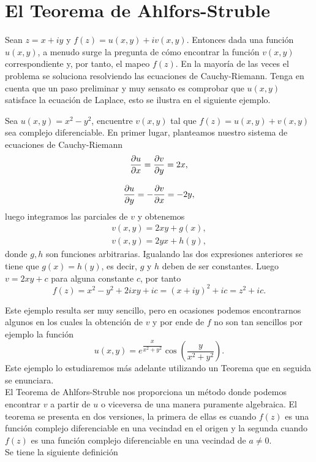 \section{El Teorema de Ahlfors-Struble}
 Sean $z = x + iy$ y $f(z) = u(x, y)+iv(x, y)$. Entonces dada una función $u(x, y)$, a menudo surge la pregunta de cómo encontrar la función $v(x,y)$ correspondiente y, por tanto, el mapeo  $f(z)$. En la mayoría de las veces el problema se soluciona resolviendo las ecuaciones de Cauchy-Riemann. Tenga en cuenta que un paso preliminar y muy sensato es comprobar que $u(x,y)$  satisface la ecuación de Laplace, esto se ilustra en el siguiente ejemplo.
 \begin{Ejem}\label{EjCR}
 	Sea $u(x,y)=x^2-y^2$, encuentre $v(x,y)$ tal que $f(z)=u(x,y)+v(x,y)$ sea complejo diferenciable.
 	\solu
 	En primer lugar, planteamos nuestro sistema de ecuaciones de Cauchy-Riemann
 	\[
 		\begin{array}{c}
 			\dfrac{\partial u}{\partial x}=\dfrac{\partial v}{\partial y}=2x,\\\\
 			\dfrac{\partial u}{\partial y}=-\dfrac{\partial v}{\partial x}=-2y,
 		\end{array}
 	\]
 	luego integramos las parciales de $v$ y obtenemos
 	\[
 		\begin{array}{c}
 			v(x,y)=2xy+g(x),\\
 			v(x,y)=2yx+h(y),
 		\end{array}
 	\]
 	donde $g,h$ son funciones arbitrarias. Igualando las dos expresiones anteriores se tiene que $g(x)=h(y)$, es decir, $g$ y $h$ deben de ser constantes. Luego $v=2xy+c$ para alguna constante $c$, por tanto 
 	$$f(z)=x^2-y^2+2ixy+ic=(x+iy)^2+ic=z^2+ic.$$\endproof
 \end{Ejem}
Este ejemplo resulta ser muy sencillo, pero en ocasiones podemos encontrarnos algunos en los cuales la obtención  de $v$ y
por ende de $f$ no son tan sencillos por ejemplo  la función 
$$u(x,y)=e^{\dfrac{x}{x^2+y^2}}\cos\left(\dfrac{y}{x^2+y^{2}}\right).$$
Este ejemplo lo estudiaremos más adelante utilizando un Teorema que en seguida se enunciara.\\
El Teorema de Ahlfors-Struble nos proporciona un método donde podemos encontrar $v$ a partir de $u$ o viceversa de una manera puramente algebraica. El teorema se presenta en dos versiones, la primera de ellas es cuando $f(z)$ es una función complejo diferenciable en una vecindad en el origen y la segunda  cuando $f(z)$ es una función complejo diferenciable en una vecindad de $a\neq 0$.\\
\noindent Se tiene la siguiente definición
